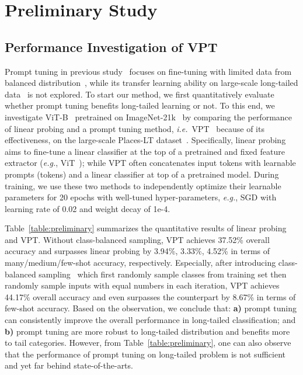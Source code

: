 \documentclass{article} \usepackage{iclr2023_conference,times}
\newcommand{\eg}{\emph{e.g.}}
\newcommand{\ie}{\emph{i.e.}}
\begin{document}
\vspace{-0.4em}
\section{Preliminary Study}\label{sec:preliminary}
\vspace{-0.2em}
\subsection{Performance Investigation of VPT}\label{sec:pre_exp}
\vspace{-0.4em}
Prompt tuning in previous study~\citep{zhou2022learning,jia2022vpt} focuses on fine-tuning with limited data from balanced distribution~\citep{zhai2019largescale}, while its transfer learning ability on large-scale long-tailed data~\citep{zhou2017places,van2018inaturalist} is not explored. To start our method, we first quantitatively evaluate whether prompt tuning benefits long-tailed learning or not. To this end,  we investigate ViT-B~\citep{dosovitskiy2021an} pretrained on ImageNet-21k~\citep{deng2009imagenet} by  comparing the performance of linear probing and a  prompt tuning method, \ie~VPT~\citep{jia2022vpt} because of its effectiveness,  on the large-scale Places-LT dataset~\citep{zhou2017places}. 
Specifically, linear probing aims to fine-tune a linear classifier at the top of a pretrained and fixed feature extractor (\eg, ViT~\citep{dosovitskiy2021an}); while VPT often concatenates input tokens with  learnable  prompts (tokens) and a  linear classifier at top of a pretrained model. During training,    we use these two methods to independently optimize their learnable parameters for 20 epochs with well-tuned hyper-parameters, \eg, SGD with learning rate of 0.02 and weight decay of 1e-4.  



Table~\ref{table:preliminary} summarizes the  quantitative results of linear probing and VPT. Without class-balanced sampling, VPT achieves 37.52\% overall accuracy and surpasses linear probing by 3.94\%, 3.33\%, 4.52\% in terms of many/medium/few-shot accuracy, respectively. 
Especially, after introducing class-balanced sampling~\citep{Kang2020Decoupling} which first randomly sample classes from training set then randomly sample inputs with equal numbers in each iteration,
VPT achieves 44.17\% overall accuracy and even surpasses the counterpart by 8.67\% in terms of few-shot accuracy. 
Based on the observation, we conclude that: \textbf{a)} prompt tuning can consistently improve the overall performance in long-tailed classification; and \textbf{b)} prompt tuning are more robust to long-tailed distribution and benefits more to tail categories.  However, from Table~\ref{table:preliminary}, one can also observe that the performance of prompt tuning on long-tailed problem is not sufficient and yet far behind  state-of-the-arts.  
\end{document}
